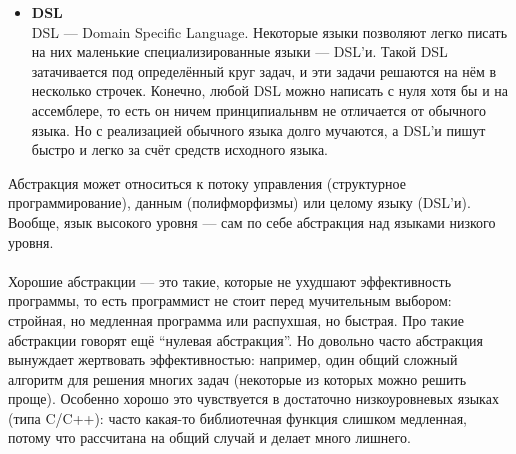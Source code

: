 \documentclass[11pt]{book}
\begin{document}
\begin{itemize}
\begin{itemize}
    \item \textbf{DSL}
        \\
        DSL --- Domain Specific Language.
        Некоторые языки позволяют легко писать на них маленькие специализированные языки --- DSL'и.
        Такой DSL затачивается под определённый круг задач, и эти задачи решаются на нём в несколько строчек.
        Конечно, любой DSL можно написать с нуля хотя бы и на ассемблере, то есть он ничем принципиальнвм не отличается от обычного языка.
        Но с реализацией обычного языка долго мучаются, а DSL'и пишут быстро и легко за счёт средств исходного языка.

    \end{itemize}
    Абстракция может относиться к потоку управления (структурное программирование), данным (полифморфизмы)
    или целому языку (DSL'и).
    Вообще, язык высокого уровня --- сам по себе абстракция над языками низкого уровня.
    \\ \\
    Хорошие абстракции --- это такие, которые не ухудшают эффективность программы,
    то есть программист не стоит перед мучительным выбором: стройная, но медленная программа или распухшая, но быстрая.
    Про такие абстракции говорят ещё ``нулевая абстракция''.
    Но довольно часто абстракция вынуждает жертвовать эффективностью:
    например, один общий сложный алгоритм для решения многих задач (некоторые из которых можно решить проще).
    Особенно хорошо это чувствуется в достаточно низкоуровневых языках (типа C/C++):
    часто какая-то библиотечная функция слишком медленная, потому что рассчитана на общий случай и делает много лишнего.


\end{itemize}
\end{document}
